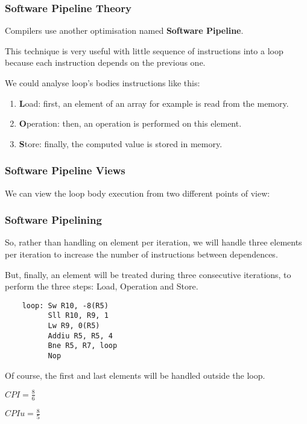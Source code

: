 
\begin{frame}
  \frametitle{Software Pipeline Theory}

  Compilers use another optimisation named \textbf{Software Pipeline}.

  \-

  This technique is very useful with little sequence of instructions into
  a loop because each instruction depends on the previous one.

  \-

  We could analyse loop's bodies instructions like this:

  \begin{enumerate}
    \item
      \textbf{L}oad: first, an element of an array for example is read from
      the memory.
    \item
      \textbf{O}peration: then, an operation is performed on this element.
    \item
      \textbf{S}tore: finally, the computed value is stored in memory.
  \end{enumerate}
\end{frame}


\begin{frame}
  \frametitle{Software Pipeline Views}

  We can view the loop body execution from two different points of view:

  \begin{center}
  \end{center}
\end{frame}


\begin{frame}[containsverbatim]
  \frametitle{Software Pipelining}

  So, rather than handling on element per iteration, we will handle
  three elements per iteration to increase the number of instructions
  between dependences.

  \-

  But, finally, an element will be treated during three consecutive
  iterations, to perform the three steps: Load, Operation and Store.

  \begin{verbatim}
    loop: Sw R10, -8(R5)
          Sll R10, R9, 1
          Lw R9, 0(R5)
          Addiu R5, R5, 4
          Bne R5, R7, loop
          Nop
  \end{verbatim}

  Of course, the first and last elements will be handled outside the loop.

  \-

  $CPI = \frac{8}{6}$

  $CPIu = \frac{8}{5}$
\end{frame}

